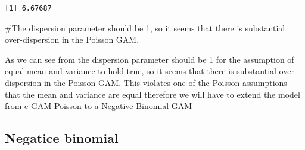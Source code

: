 \documentclass[
  letterpaper,
  DIV=11,
  numbers=noendperiod]{scrartcl}
\newenvironment{Shaded}{\begin{snugshade}}{\end{snugshade}}
\newcommand{\CommentTok}[1]{\textcolor[rgb]{0.37,0.37,0.37}{#1}}
\begin{document}
\begin{verbatim}
[1] 6.67687
\end{verbatim}

\begin{Shaded}
\begin{Highlighting}[]
\CommentTok{\#The dispersion parameter should be 1, so it seems that there is substantial over{-}dispersion in the Poisson GAM.}
\end{Highlighting}
\end{Shaded}

As we can see from the dispersion parameter should be 1 for the
assumption of equal mean and variance to hold true, so it seems that
there is substantial over-dispersion in the Poisson GAM. This violates
one of the Poisson assumptions that the mean and variance are equal
therefore we will have to extend the model from e GAM Poisson to a
Negative Binomial GAM

\hypertarget{negatice-binomial}{%
\subsection{Negatice binomial}\label{negatice-binomial}}
\end{document}
